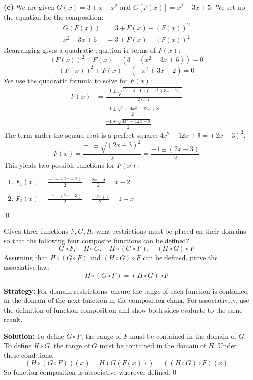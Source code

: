\textbf{(e)}
We are given $G(x) = 3 + x + x^2$ and $G[F(x)] = x^2 - 3x + 5$.
We set up the equation for the composition:
\begin{align*}
G(F(x)) &= 3 + F(x) + (F(x))^2 \\
x^2 - 3x + 5 &= 3 + F(x) + (F(x))^2
\end{align*}
Rearranging gives a quadratic equation in terms of $F(x)$:
\[ (F(x))^2 + F(x) + (3 - (x^2 - 3x + 5)) = 0 \]
\[ (F(x))^2 + F(x) + (-x^2 + 3x - 2) = 0 \]
We use the quadratic formula to solve for $F(x)$:
\begin{align*}
F(x) &= \frac{-1 \pm \sqrt{1^2 - 4(1)(-x^2+3x-2)}}{2(1)} \\
&= \frac{-1 \pm \sqrt{1 + 4x^2 - 12x + 8}}{2} \\
&= \frac{-1 \pm \sqrt{4x^2 - 12x + 9}}{2}
\end{align*}
The term under the square root is a perfect square: $4x^2 - 12x + 9 = (2x-3)^2$.
\[ F(x) = \frac{-1 \pm \sqrt{(2x-3)^2}}{2} = \frac{-1 \pm (2x-3)}{2} \]
This yields two possible functions for $F(x)$:
\begin{enumerate}
\item $F_1(x) = \frac{-1 + (2x-3)}{2} = \frac{2x-4}{2} = x-2$
\item $F_2(x) = \frac{-1 - (2x-3)}{2} = \frac{-2x+2}{2} = 1-x$
\end{enumerate}\qed



\begin{problembox}
Given three functions \( F, G, H \), what restrictions must be placed on their domains so that the following four composite functions can be defined?
\[
G \circ F, \quad H \circ G, \quad H \circ (G \circ F), \quad (H \circ G) \circ F
\]
Assuming that \( H \circ (G \circ F) \) and \( (H \circ G) \circ F \) can be defined, prove the associative law:
\[
H \circ (G \circ F) = (H \circ G) \circ F
\]
\end{problembox}

\noindent\textbf{Strategy:} For domain restrictions, ensure the range of each function is contained in the domain of the next function in the composition chain. For associativity, use the definition of function composition and show both sides evaluate to the same result.

\bigskip\noindent\textbf{Solution:}  
To define \( G \circ F \), the range of \( F \) must be contained in the domain of \( G \).  
To define \( H \circ G \), the range of \( G \) must be contained in the domain of \( H \).  
Under these conditions,  
\[
(H \circ (G \circ F))(x) = H(G(F(x))) = ((H \circ G) \circ F)(x)
\]  
So function composition is associative wherever defined.\qed

